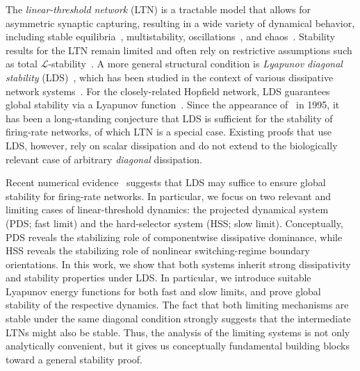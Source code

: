 \documentclass[letterpaper, conference]{ieeeconf}
\newcommand{\1}{\mathbf{1}}
\newcommand{\mc}{\mathcal}
\begin{document}
The \emph{linear-threshold network} (LTN) is a tractable model that allows for asymmetric synaptic capturing, resulting in a wide variety of dynamical behavior, including stable equilibria~\cite{EN-JC:21}, multistability, oscillations~\cite{EN-RP-JC:22}, and chaos~\cite{KM-AD-VI-CC:24}.
Stability results for the LTN remain limited and often rely on restrictive assumptions such as total \(\mc L\)-stability~\cite{EN-JC:21}. 
A more general structural condition is \emph{Lyapunov diagonal stability} (LDS)~\cite{EK-AB:00}, which has been studied in the context of various dissipative network systems~\cite{MA-CM-AP:16}.
For the closely-related Hopfield network, LDS guarantees global stability via a Lyapunov function~\cite{FM-TA:95}.
Since the appearance of~\cite{FM-TA:95} in 1995, it has been a long-standing conjecture that LDS is sufficient for the stability of firing-rate networks, of which LTN is a special case.
Existing proofs that use LDS, however, rely on scalar dissipation and do not extend to the biologically relevant case of arbitrary \emph{diagonal} dissipation. 

Recent numerical evidence~\cite{BS-RW-DA:26} suggests that LDS may suffice to ensure global stability for firing-rate networks.
In particular, we focus on two relevant and limiting cases of linear-threshold dynamics: the projected dynamical system (PDS; fast limit) and the hard-selector system (HSS; slow limit). 
Conceptually, PDS reveals the stabilizing role of componentwise dissipative dominance, while HSS reveals the stabilizing role of nonlinear switching-regime boundary orientations.
In this work, we show that both systems inherit strong dissipativity and stability properties under LDS. 
In particular, we introduce suitable Lyapunov energy functions for both fast and slow limits, and prove global stability of the respective dynamics. 
The fact that both limiting mechanisms are stable under the same diagonal condition strongly suggests that the intermediate LTNs might also be stable. 
Thus, the analysis of the limiting systems is not only analytically convenient, but it gives us conceptually fundamental building blocks toward a general stability proof.
\end{document}
